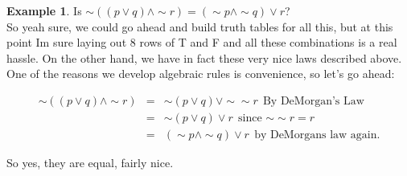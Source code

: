 \documentclass[10pt]{article}
\theoremstyle{definition}
\newtheorem{example}[equation]{Example}
\begin{document}
\begin{example}
Is $\sim((p \vee q)\wedge \sim r)=(\sim p \wedge \sim q )\vee r$?\\

So yeah sure, we could go ahead and build truth tables for all this, but at this point Im sure laying out 8 rows of T and F and all these combinations is a real hassle.  On the other hand, we have in fact these very nice laws described above.  One of the reasons we develop algebraic rules is convenience, so let's go ahead:

\begin{eqnarray*}
\sim((p \vee q)\wedge \sim r)&=&\sim(p \vee q)\vee \sim\sim r\ \ \text{By DeMorgan's Law}\\
&=&\sim(p \vee q)\vee r \ \ \text{since $\sim\sim r=r$}\\
&=&(\sim p \wedge \sim q )\vee r \ \ \text{by DeMorgans law again.}
\end{eqnarray*}

So yes, they are equal, fairly nice.
\end{example}
\end{document}
